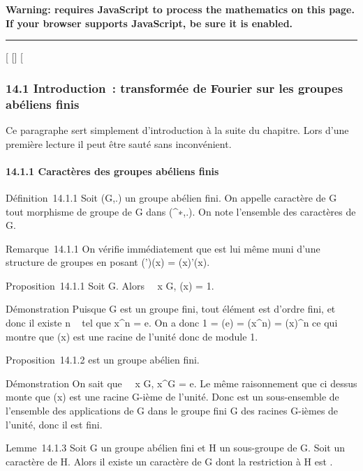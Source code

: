 \textbf{Warning: 
requires JavaScript to process the mathematics on this page.\\ If your
browser supports JavaScript, be sure it is enabled.}

\begin{center}\rule{3in}{0.4pt}\end{center}

{[}
{[}{]}
{[}

\subsubsection{14.1 Introduction~: transformée de Fourier sur les
groupes abéliens finis}

Ce paragraphe sert simplement d'introduction à la suite du chapitre.
Lors d'une première lecture il peut être sauté sans inconvénient.

\paragraph{14.1.1 Caractères des groupes abéliens finis}

Définition~14.1.1 Soit (G,.) un groupe abélien fini. On appelle
caractère de G tout morphisme de groupe \chi de G dans (^∗,.).
On note \hatG l'ensemble des caractères de G.

Remarque~14.1.1 On vérifie immédiatement que \hatG
est lui même muni d'une structure de groupes en posant (\chi\chi')(x) =
\chi(x)\chi'(x).

Proposition~14.1.1 Soit \chi \in\hat G. Alors
\forall~~x \in G, \textbar{}\chi(x)\textbar{} = 1.

Démonstration Puisque G est un groupe fini, tout élément est d'ordre
fini, et donc il existe n \in {}~ tel que x^n = e. On a donc 1 =
\chi(e) = \chi(x^n) = \chi(x)^n ce qui montre que \chi(x) est
une racine de l'unité donc de module 1.

Proposition~14.1.2 \hatG est un groupe abélien fini.

Démonstration On sait que \forall~~x \in G,
x^\textbar{}G\textbar{} = e. Le même raisonnement que ci
dessus monte que \chi(x) est une racine \textbar{}G\textbar{}-ième de
l'unité. Donc \hatG est un sous-ensemble de
l'ensemble des applications de G dans le groupe fini
\Gamma\textbar{}G\textbar{} des racines \textbar{}G\textbar{}-ièmes
de l'unité, donc il est fini.

Lemme~14.1.3 Soit G un groupe abélien fini et H un sous-groupe de G.
Soit \psi un caractère de H. Alors il existe un caractère \chi de G dont la
restriction à H est \psi.

